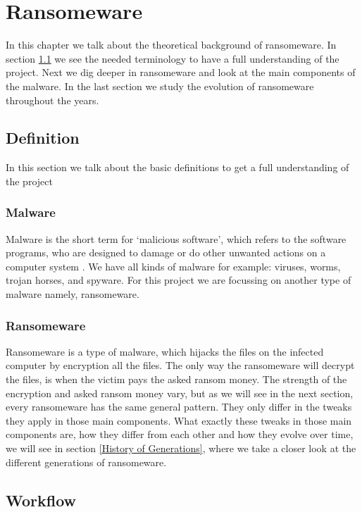 \chapter{Ransomeware}\label{Ransomeware}

In this chapter we talk about the theoretical background of ransomeware.
In section \ref{Definition} we see the needed terminology to have a full understanding of the project.
Next we dig deeper in ransomeware and look at the main components of the malware. In the last section we study the evolution of ransomeware throughout the years.


\section{Definition}\label{Definition}

In this section we talk about the basic definitions to get a full understanding of the project
\subsection{Malware}

Malware is the short term for `malicious software', which refers to the software programs, who are designed to damage or do other unwanted actions on a computer system \cite{malware}. We have all kinds of malware for example: viruses, worms, trojan horses, and spyware. For this project we are focussing on another type of malware namely, ransomeware.

\subsection{Ransomeware}

Ransomeware is a type of malware, which hijacks the files on the infected computer by encryption all the files. The only way the ransomeware will decrypt the files, is when the victim pays the asked ransom money. The strength of the encryption and asked ransom money vary, but as we will see in the next section, every ransomeware has the same general pattern. They only differ in the tweaks they apply in those main components. What exactly these tweaks in those main components are, how they differ from each other and how they evolve over time, we will see in section \ref{History of Generations}, where we take a closer look at the different generations of ransomeware.


\section{Workflow}\label{workflow}

